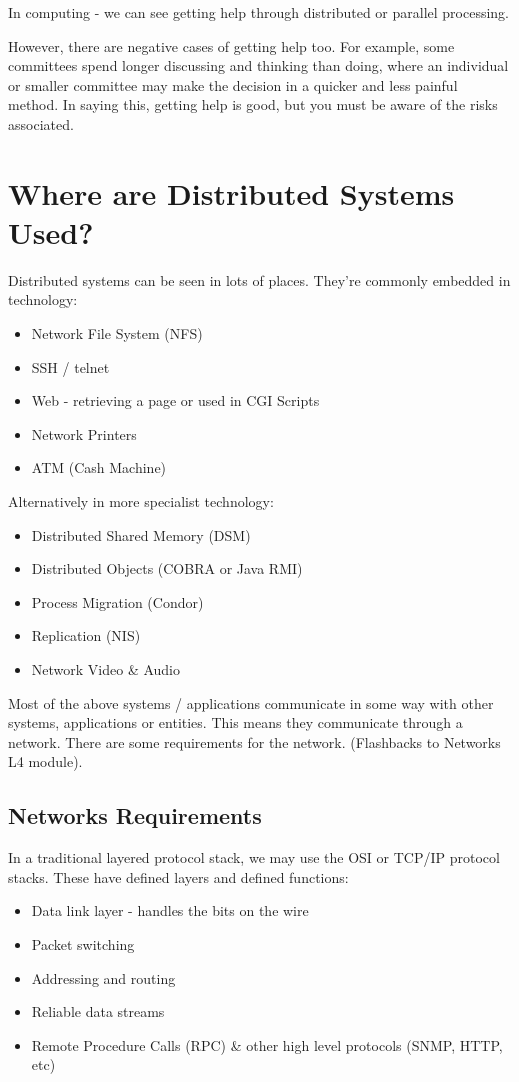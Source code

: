 In computing - we can see getting help through distributed or parallel processing.

However, there are negative cases of getting help too. For example, some committees spend longer discussing and thinking than doing, where an individual or smaller committee may make the decision in a quicker and less painful method. In saying this, getting help is good, but you must be aware of the risks associated.

\section{Where are Distributed Systems Used?}
Distributed systems can be seen in lots of places. They're commonly embedded in technology:
\begin{itemize}
    \item Network File System (NFS)
    \item SSH / telnet
    \item Web - retrieving a page or used in CGI Scripts
    \item Network Printers
    \item ATM (Cash Machine)
\end{itemize}

Alternatively in more specialist technology:
\begin{itemize}
    \item Distributed Shared Memory (DSM)
    \item Distributed Objects (COBRA or Java RMI)
    \item Process Migration (Condor)
    \item Replication (NIS)
    \item Network Video \& Audio
\end{itemize}

Most of the above systems / applications communicate in some way with other systems, applications or entities. This means they communicate through a network. There are some requirements for the network. (Flashbacks to Networks L4 module).

\subsection{Networks Requirements}
In a traditional layered protocol stack, we may use the OSI or TCP/IP protocol stacks. These have defined layers and defined functions:
\begin{itemize}
    \item Data link layer - handles the bits on the wire
    \item Packet switching
    \item Addressing and routing
    \item Reliable data streams 
    \item Remote Procedure Calls (RPC) \& other high level protocols (SNMP, HTTP, etc)
\end{itemize}

